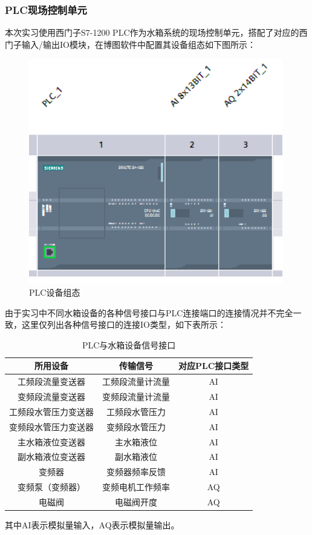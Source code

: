 \documentclass[UTF8]{article}
\begin{document}
\subsubsection{PLC现场控制单元}
本次实习使用西门子S7-1200 PLC作为水箱系统的现场控制单元，搭配了对应的西门子输入/输出IO模块，在博图软件中配置其设备组态如下图所示：
\begin{figure}[H]
    \centering %
    \includegraphics[width=.6\textwidth]{figure/PLC设备组态.png} 
    \caption{PLC设备组态} %
\end{figure}

由于实习中不同水箱设备的各种信号接口与PLC连接端口的连接情况并不完全一致，这里仅列出各种信号接口的连接IO类型，如下表所示：
\begin{table}[H] %
\centering %
\begin{tabular}{ccc} %
	\toprule %
	所用设备 & 传输信号 & 对应PLC接口类型 \\
	\midrule %
	工频段流量变送器 & 工频段流量计流量 & AI \\ 
	变频段流量变送器 & 变频段流量计流量 & AI \\ 
	工频段水管压力变送器 & 工频段水管压力 & AI \\ 
	变频段水管压力变送器 & 变频段水管压力 & AI \\ 
	主水箱液位变送器 & 主水箱液位 & AI \\
	副水箱液位变送器 & 副水箱液位 & AI \\
	变频器 & 变频器频率反馈 & AI \\
	变频泵（变频器） & 变频电机工作频率 & AQ \\
	电磁阀 & 电磁阀开度 & AQ \\
	\bottomrule %
\end{tabular}
\caption{PLC与水箱设备信号接口} %
\end{table}
其中AI表示模拟量输入，AQ表示模拟量输出。
\end{document}
